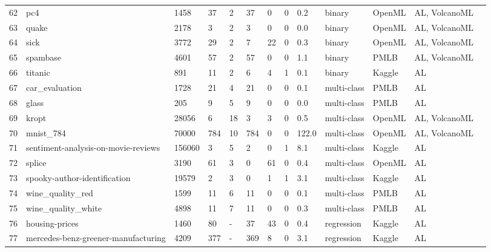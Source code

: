 \begin{table*}
\begin{tabular}{lllllllllllll}
62  & pc4                                         & 1458    & 37     & 2     & 37    & 0      & 0         & 0.2       & binary      & OpenML & AL, VolcanoML    \\
63  & quake                                       & 2178    & 3      & 2     & 3     & 0      & 0         & 0.0       & binary      & OpenML & AL, VolcanoML    \\
64  & sick                                        & 3772    & 29     & 2     & 7     & 22     & 0         & 0.3       & binary      & OpenML & AL, VolcanoML    \\
65  & spambase                                    & 4601    & 57     & 2     & 57    & 0      & 0         & 1.1       & binary      & PMLB   & AL, VolcanoML    \\
66  & titanic                                     & 891     & 11     & 2     & 6     & 4      & 1         & 0.1       & binary      & Kaggle & AL               \\
67  & car\_evaluation                             & 1728    & 21     & 4     & 21    & 0      & 0         & 0.1       & multi-class & PMLB   & AL               \\
68  & glass                                       & 205     & 9      & 5     & 9     & 0      & 0         & 0.0       & multi-class & PMLB   & AL               \\
69  & kropt                                       & 28056   & 6      & 18    & 3     & 3      & 0         & 0.5       & multi-class & OpenML & AL, VolcanoML    \\
70  & mnist\_784                                  & 70000   & 784    & 10    & 784   & 0      & 0         & 122.0     & multi-class & OpenML & AL, VolcanoML    \\
71  & sentiment-analysis-on-movie-reviews         & 156060  & 3      & 5     & 2     & 0      & 1         & 8.1       & multi-class & Kaggle & AL               \\
72  & splice                                      & 3190    & 61     & 3     & 0     & 61     & 0         & 0.4       & multi-class & OpenML & AL               \\
73  & spooky-author-identification                & 19579   & 2      & 3     & 0     & 1      & 1         & 3.1       & multi-class & Kaggle & AL               \\
74  & wine\_quality\_red                          & 1599    & 11     & 6     & 11    & 0      & 0         & 0.1       & multi-class & PMLB   & AL               \\
75  & wine\_quality\_white                        & 4898    & 11     & 7     & 11    & 0      & 0         & 0.3       & multi-class & PMLB   & AL               \\
76  & housing-prices                              & 1460    & 80     & -     & 37    & 43     & 0         & 0.4       & regression  & Kaggle & AL               \\
77  & mercedes-benz-greener-manufacturing         & 4209    & 377    & -     & 369   & 8      & 0         & 3.1       & regression  & Kaggle & AL               \\


\end{tabular}
\end{table*}
